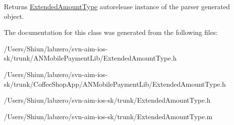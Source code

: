 \begin{DoxyReturn}{Returns}
\hyperlink{interface_extended_amount_type}{ExtendedAmountType} autorelease instance of the parser generated object. 
\end{DoxyReturn}


The documentation for this class was generated from the following files:\begin{DoxyCompactItemize}
\item 
/Users/Shiun/labzero/svn-\/aim-\/ios-\/sk/trunk/ANMobilePaymentLib/ExtendedAmountType.h\item 
/Users/Shiun/labzero/svn-\/aim-\/ios-\/sk/trunk/CoffeeShopApp/ANMobilePaymentLib/ExtendedAmountType.h\item 
/Users/Shiun/labzero/svn-\/aim-\/ios-\/sk/trunk/ExtendedAmountType.h\item 
/Users/Shiun/labzero/svn-\/aim-\/ios-\/sk/trunk/ExtendedAmountType.m\end{DoxyCompactItemize}
